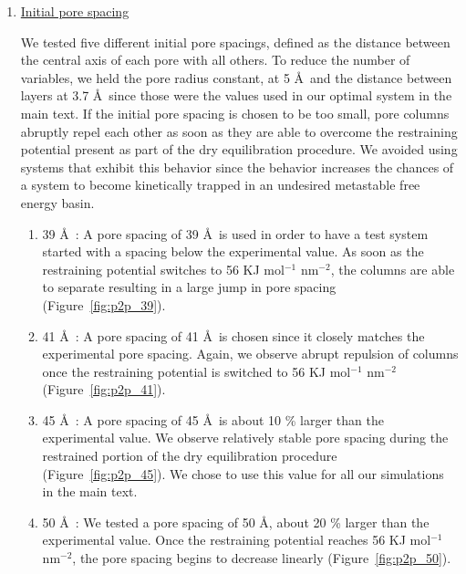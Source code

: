 \documentclass{article}
\begin{document}

  \begin{enumerate}

	  \item \underline{Initial pore spacing}

	  We tested five different initial pore spacings, defined as the
	  distance between the central axis of each pore with all others. To reduce the
	  number of variables, we held the pore radius constant, at 5 \AA~and the
	  distance between layers at 3.7 \AA~since those were the values used in our
	  optimal system in the main text. If the initial pore spacing is chosen to be
	  too small, pore columns abruptly repel each other as soon as they are able to
	  overcome the restraining potential present as part of the dry equilibration
	  procedure. We avoided using systems that exhibit this behavior since the
	  behavior increases the chances of a system to become kinetically trapped in an
	  undesired metastable free energy basin.  

	  \begin{enumerate}

	  	\item 39 \AA~: A pore spacing of 39 \AA~is used in order to have a test system
		started with a spacing below the experimental value. As soon as the restraining
		potential switches to 56 KJ mol$^{-1}$ nm$^{-2}$, the columns are able to
		separate resulting in a large jump in pore spacing (Figure~\ref{fig:p2p_39}). 

		\item 41 \AA~: A pore spacing of 41 \AA~is chosen since it closely matches the
		experimental pore spacing.  Again, we observe abrupt repulsion of columns once
		the restraining potential is switched to 56 KJ mol$^{-1}$ nm$^{-2}$
		(Figure~\ref{fig:p2p_41}).

		\item 45 \AA~: A pore spacing of 45 \AA~is about 10 \% larger than the
		experimental value. We observe relatively stable pore spacing during the
		restrained portion of the dry equilibration procedure
		(Figure~\ref{fig:p2p_45}). We chose to use this value for all our simulations
		in the main text. 

		\item 50 \AA~: We tested a pore spacing of 50 \AA, about 20 \% larger than the
		experimental value. Once the restraining potential reaches 56 KJ mol$^{-1}$
		nm$^{-2}$, the pore spacing begins to decrease linearly (Figure~\ref{fig:p2p_50}).


\end{enumerate}
\end{enumerate}
\end{document}
